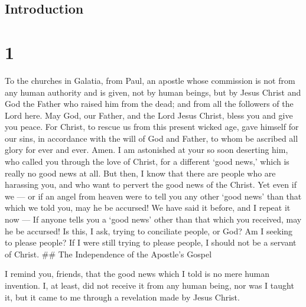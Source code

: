 \hypertarget{introduction}{%
\subsection{Introduction}\label{introduction}}

\hypertarget{section}{%
\section{1}\label{section}}

 To the churches in Galatia, from Paul, an apostle whose
commission is not from any human authority and is given, not by human
beings, but by Jesus Christ and God the Father who raised him from the
dead;  and from all the followers of the Lord here.
 May God, our Father, and the Lord Jesus Christ, bless you
and give you peace. For Christ, to rescue us from this present wicked
age,  gave himself for our sins, in accordance with the will
of God and Father,  to whom be ascribed all glory for ever
and ever. Amen.  I am astonished at your so soon deserting
him, who called you through the love of Christ, for a different `good
news,'  which is really no good news at all. But then, I
know that there are people who are harassing you, and who want to
pervert the good news of the Christ.  Yet even if we --- or
if an angel from heaven were to tell you any other `good news' than that
which we told you, may he be accursed!  We have said it
before, and I repeat it now --- If anyone tells you a `good news' other
than that which you received, may he be accursed!  Is this,
I ask, trying to conciliate people, or God? Am I seeking to please
people? If I were still trying to please people, I should not be a
servant of Christ. \#\# The Independence of the Apostle's Gospel

 I remind you, friends, that the good news which I told is
no mere human invention.  I, at least, did not receive it
from any human being, nor was I taught it, but it came to me through a
revelation made by Jesus Christ.

